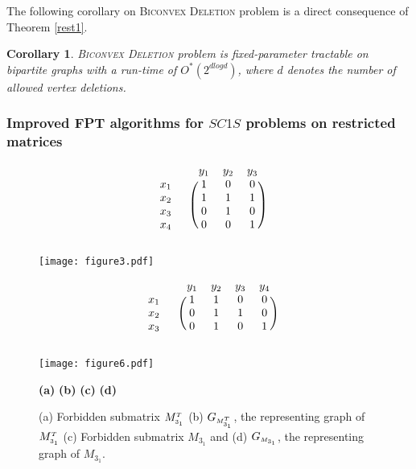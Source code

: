 \documentclass[review, 1p]{elsarticle}
\newtheorem{corollary}{Corollary}
\begin{document}
\noindent The following corollary on \textsc{Biconvex Deletion} problem is a direct consequence of Theorem \ref{rest1}.
\begin{corollary}
\textsc{Biconvex Deletion} problem is fixed-parameter tractable on bipartite graphs with a run-time of $O^{*}(2^{dlogd})$, where $d$ denotes the number of allowed vertex deletions.
\end{corollary}
\subsubsection{\textup{\textbf{Improved FPT algorithms for $SC1S$ problems on restricted matrices}}}\label{restrctd}
\begin{figure}[t]
\begin{minipage}{.25\linewidth} 
  \[
\begin{blockarray}{ccccc}
   & & y_{1} & y_{2} & y_{3} \\
\begin{block}{cc (ccc)}
   x_{1} & & 1 & 0 & 0 \\
   x_{2} & & 1 & 1 & 1  \\
   x_{3} & & 0 & 1 & 0 \\
   x_{4} & & 0 & 0 & 1  \\
   \end{block}
\end{blockarray}\]
  \end{minipage}
 \begin{minipage}{.2\linewidth}
\texttt{[image: figure3.pdf]}
\end{minipage}
 \begin{minipage}{.33\linewidth} 
  \[
\begin{blockarray}{cccccc}
   & & y_{1} & y_{2} & y_{3} & y_{4}\\
\begin{block}{cc(cccc)}
   x_{1} & & 1 & 1 & 0 & 0\\
   x_{2} & & 0 & 1 & 1 & 0 \\
   x_{3} & & 0 & 1 & 0 & 1 \\
   \end{block}
\end{blockarray}\]
  \end{minipage}
 \begin{minipage}{.2\linewidth}
\texttt{[image: figure6.pdf]}
\end{minipage}   
\indent \hspace{0.5 in} \textbf{(a)} \hspace{1.0 in} \textbf{(b)} \hspace{1.0 in} \textbf{(c)} \hspace{0.85 in} \textbf{(d)}
  \caption{(a) Forbidden submatrix ${M^{\mathsmaller T}_{\mathsmaller 3_{1}}}$ (b) ${G_{\mathsmaller{M}_{3_{1}}^{\mathsmaller T}}}$, the representing graph of ${M^{\mathsmaller T}_{\mathsmaller 3_{1}}}$ (c) Forbidden submatrix $M_{3_{1}}$ and (d) $G_{\mathsmaller{M}_{3_{1}}}$, the representing graph of $M_{3_{1}}$.  \label{eg1}}
\end{figure}
\end{document}

